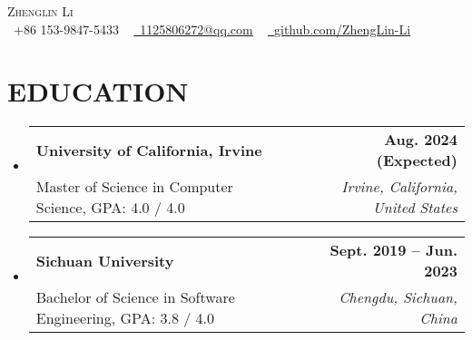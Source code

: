 \documentclass[letterpaper,11pt]{article}
\makeatletter
\newcommand{\resumeSubheading}[4]{
  \vspace{-2pt}\item
    \begin{tabular*}{1.0\textwidth}[t]{l@{\extracolsep{\fill}}r}
      \textbf{#1} & \textbf{\small #2} \\
      {\small#3} & \textit{\small #4} \\
    \end{tabular*}\vspace{-7pt}
}
\newcommand{\resumeSubHeadingListStart}{\begin{itemize}[leftmargin=0.0in, label={}]}
\newcommand{\resumeSubHeadingListEnd}{\end{itemize}}
\makeatother
\begin{document}

\begin{center}
    {\Huge \scshape Zhenglin Li} \\ \vspace{1pt}
    \small \raisebox{-0.1\height}\faPhone\ +86 153-9847-5433 ~ \href{mailto:lizhenglin2001@gmail.com}{\raisebox{-0.2\height}\faEnvelope\  \underline{1125806272@qq.com}} ~ 
    \href{github.com/ZhengLin-Li}{\raisebox{-0.2\height}\faGithub\ \underline{github.com/ZhengLin-Li}}
    \vspace{3pt}{\\Seeking Software Development Engineer New Grad and Internship Roles}
    \vspace{-8pt}
\end{center}


\section{EDUCATION}
  \resumeSubHeadingListStart
    \resumeSubheading
      {University of California, Irvine}{ Aug. 2024 (Expected)}
      {Master of Science in Computer Science, GPA: 4.0 / 4.0}{Irvine, California, United States}
    \resumeSubheading
      {Sichuan University}{Sept. 2019 -- Jun. 2023}
      {Bachelor of Science in Software Engineering, GPA: 3.8 / 4.0}{Chengdu, Sichuan, China}
  \resumeSubHeadingListEnd
\end{document}
